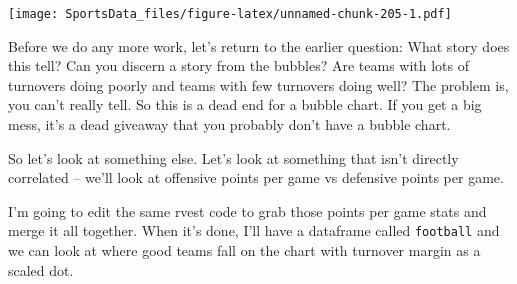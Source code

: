 \documentclass[]{book}
\begin{document}
\texttt{[image: SportsData\_files/figure-latex/unnamed-chunk-205-1.pdf]}

Before we do any more work, let's return to the earlier question: What story does this tell? Can you discern a story from the bubbles? Are teams with lots of turnovers doing poorly and teams with few turnovers doing well? The problem is, you can't really tell. So this is a dead end for a bubble chart. If you get a big mess, it's a dead giveaway that you probably don't have a bubble chart.

So let's look at something else. Let's look at something that isn't directly correlated -- we'll look at offensive points per game vs defensive points per game.

I'm going to edit the same rvest code to grab those points per game stats and merge it all together. When it's done, I'll have a dataframe called \texttt{football} and we can look at where good teams fall on the chart with turnover margin as a scaled dot.
\end{document}
